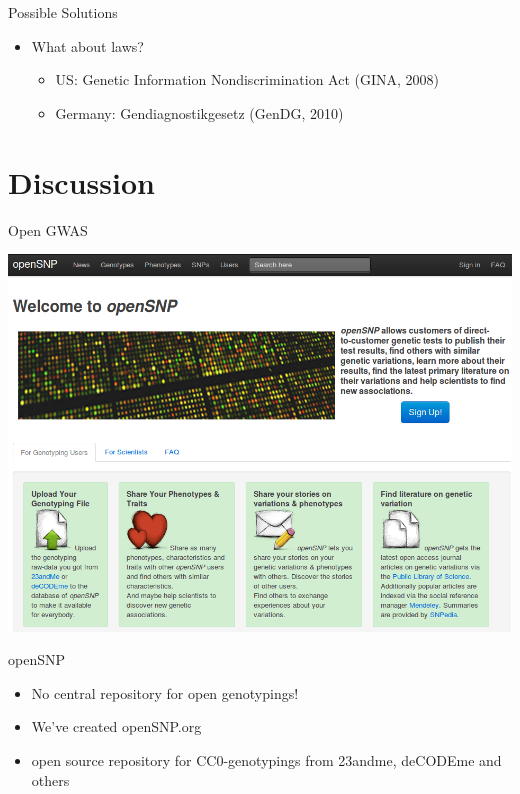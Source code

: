 \documentclass[12pt,a4paper]{beamer}
\begin{document}
\begin{frame}{Possible Solutions}
\begin{itemize}
\item What about laws?
\begin{itemize} 
\pause \item US: Genetic Information Nondiscrimination Act (GINA, 2008)
\pause \item Germany: Gendiagnostikgesetz (GenDG, 2010)
\end{itemize}
\end{itemize}
\end{frame}

\section{Discussion}

\begin{frame}{Open GWAS}
\begin{center}
\includegraphics[scale=0.4]{opensnp.png}
\end{center}
\end{frame}

\begin{frame}{openSNP}
\begin{itemize}
\item No central repository for open genotypings!
\pause \item We've created openSNP.org
\pause \item open source repository for CC0-genotypings from 23andme, deCODEme and others
\end{itemize}
\end{frame}
\end{document}
